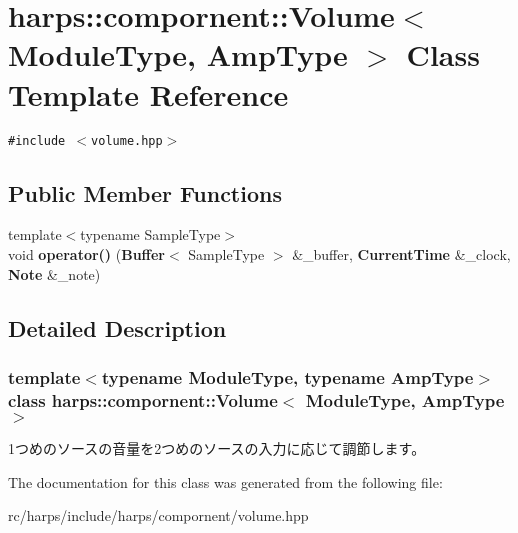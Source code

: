 \section{harps::compornent::Volume$<$ ModuleType, AmpType $>$ Class Template Reference}
\label{classharps_1_1compornent_1_1Volume}
{\tt \#include $<$volume.hpp$>$}

\subsection*{Public Member Functions}
\begin{CompactItemize}
\item 
{\footnotesize template$<$typename SampleType$>$ }\\void \textbf{operator()} ({\bf Buffer}$<$ SampleType $>$ \&\_\-buffer, {\bf CurrentTime} \&\_\-clock, {\bf Note} \&\_\-note)\label{classharps_1_1compornent_1_1Volume_7268469f57d241e7a8e0bedf98d7a0e8}

\end{CompactItemize}


\subsection{Detailed Description}
\subsubsection*{template$<$typename ModuleType, typename AmpType$>$ class harps::compornent::Volume$<$ ModuleType, AmpType $>$}

1つめのソースの音量を2つめのソースの入力に応じて調節します。 

The documentation for this class was generated from the following file:\begin{CompactItemize}
\item 
rc/harps/include/harps/compornent/volume.hpp\end{CompactItemize}
